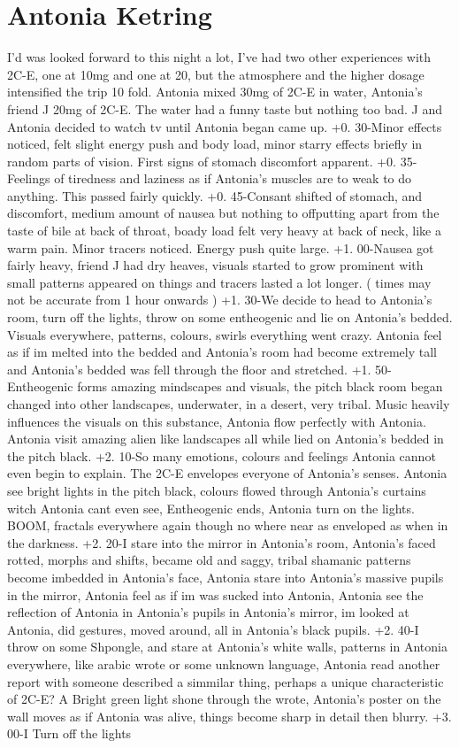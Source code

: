 \documentclass[12pt]{book}
\begin{document}
\chapter{Antonia Ketring}

I'd was looked forward to this night a lot, I've had two other experiences with 2C-E, one at 10mg and one at 20, but the atmosphere and the higher dosage intensified the trip 10 fold. Antonia mixed 30mg of 2C-E in water, Antonia's friend J 20mg of 2C-E. The water had a funny taste but nothing too bad. J and Antonia decided to watch tv until Antonia began came up. +0. 30-Minor effects noticed, felt slight energy push and body load, minor starry effects briefly in random parts of vision. First signs of stomach discomfort apparent. +0. 35-Feelings of tiredness and laziness as if Antonia's muscles are to weak to do anything. This passed fairly quickly. +0. 45-Consant shifted of stomach, and discomfort, medium amount of nausea but nothing to offputting apart from the taste of bile at back of throat, boady load felt very heavy at back of neck, like a warm pain. Minor tracers noticed. Energy push quite large. +1. 00-Nausea got fairly heavy, friend J had dry heaves, visuals started to grow prominent with small patterns appeared on things and tracers lasted a lot longer. ( times may not be accurate from 1 hour onwards ) +1. 30-We decide to head to Antonia's room, turn off the lights, throw on some entheogenic and lie on Antonia's bedded. Visuals everywhere, patterns, colours, swirls everything went crazy. Antonia feel as if im melted into the bedded and Antonia's room had become extremely tall and Antonia's bedded was fell through the floor and stretched. +1. 50-Entheogenic forms amazing mindscapes and visuals, the pitch black room began changed into other landscapes, underwater, in a desert, very tribal. Music heavily influences the visuals on this substance, Antonia flow perfectly with Antonia. Antonia visit amazing alien like landscapes all while lied on Antonia's bedded in the pitch black. +2. 10-So many emotions, colours and feelings Antonia cannot even begin to explain. The 2C-E envelopes everyone of Antonia's senses. Antonia see bright lights in the pitch black, colours flowed through Antonia's curtains witch Antonia cant even see, Entheogenic ends, Antonia turn on the lights. BOOM, fractals everywhere again though no where near as enveloped as when in the darkness. +2. 20-I stare into the mirror in Antonia's room, Antonia's faced rotted, morphs and shifts, became old and saggy, tribal shamanic patterns become imbedded in Antonia's face, Antonia stare into Antonia's massive pupils in the mirror, Antonia feel as if im was sucked into Antonia, Antonia see the reflection of Antonia in Antonia's pupils in Antonia's mirror, im looked at Antonia, did gestures, moved around, all in Antonia's black pupils. +2. 40-I throw on some Shpongle, and stare at Antonia's white walls, patterns in Antonia everywhere, like arabic wrote or some unknown language, Antonia read another report with someone described a simmilar thing, perhaps a unique characteristic of 2C-E? A Bright green light shone through the wrote, Antonia's poster on the wall moves as if Antonia was alive, things become sharp in detail then blurry. +3. 00-I Turn off the lights 
\end{document}
